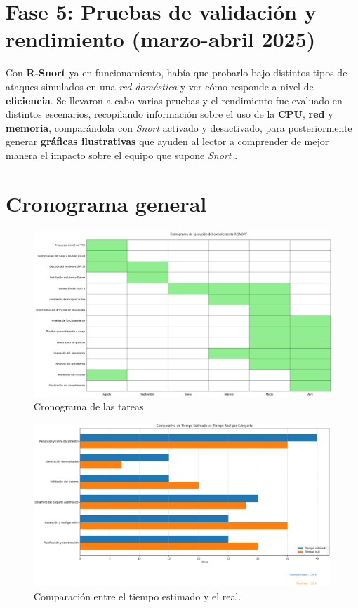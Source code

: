 \documentclass[11pt,a4paper,twoside]{report}
\begin{document}
\section{Fase 5: Pruebas de validación y rendimiento (marzo-abril 2025)}

Con \textbf{R-Snort} ya en funcionamiento, había que probarlo bajo distintos tipos de ataques simulados en una \textit{red doméstica} y ver cómo responde a nivel de \textbf{eficiencia}. Se llevaron a cabo varias pruebas y el rendimiento fue evaluado en distintos escenarios, recopilando información sobre el uso de la \textbf{CPU}, \textbf{red} y \textbf{memoria}, comparándola con \textit{Snort} activado y desactivado, para posteriormente generar \textbf{gráficas ilustrativas} que ayuden al lector a comprender de mejor manera el impacto sobre el equipo que supone \textit{Snort} \cite{kuruvila2022explainable}.

\pagebreak

\section{Cronograma general}

\begin{figure}[H]
	\centering
	\includegraphics[scale=0.35]{cronograma/cronograma.png}
	\caption{Cronograma de las tareas.}
\end{figure}

\begin{figure}[H]
	\centering
	\includegraphics[scale=0.35]{cronograma/real_estimado.png}
	\caption{Comparación entre el tiempo estimado y el real.}
\end{figure}
\end{document}
